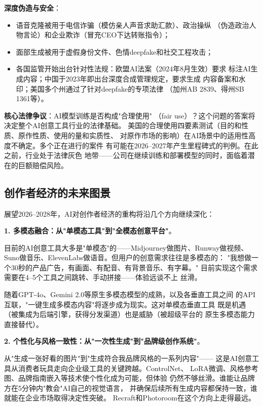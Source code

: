 \begin{warnbox}
\textbf{深度伪造与安全}：
\begin{itemize}
  \item 语音克隆被用于电信诈骗（模仿亲人声音求助汇款）、政治操纵
    （伪造政治人物言论）和企业欺诈（冒充CEO下达转账指令）；
  \item 面部生成被用于虚假身份文件、色情deepfake和社交工程攻击；
  \item 各国监管开始出台针对性法规：欧盟AI法案（2024年8月生效）要求
    标注AI生成内容；中国于2023年即出台深度合成管理规定，要求生成
    内容备案和水印；美国多个州通过了针对deepfake的专项法律
    （加州AB 2839、得州SB 1361等）。
\end{itemize}

\medskip
\noindent \textbf{核心法律争议}：AI模型训练是否构成"合理使用"
（fair use）？这个问题的答案将决定整个AI创意工具行业的法律基础。
美国的合理使用四要素测试（目的和性质、原作性质、使用的量和实质性、
对原作市场的影响）在AI场景中的适用性高度不确定。多个正在进行的案件
有可能在2026--2027年产生里程碑式的判例。在此之前，行业处于法律灰色
地带——公司在继续训练和部署模型的同时，面临着潜在的巨额赔偿风险。
\end{warnbox}

\subsection{创作者经济的未来图景}
\label{subsec:create-future}

展望2026--2028年，AI对创作者经济的重构将沿几个方向继续深化：

\textbf{1. 多模态融合：从"单模态工具"到"全模态创意平台"}。

目前的AI创意工具大多是"单模态"的——Midjourney做图片、Runway做视频、
Suno做音乐、ElevenLabs做语音。但用户的创意需求往往是多模态的：
"我想做一个30秒的产品广告，有画面、有配音、有背景音乐、有字幕。"
目前实现这个需求需要在4--5个工具之间跳转、手动拼接——体验远谈不上
丝滑。

随着GPT-4o、Gemini 2.0等原生多模态模型的成熟，以及各垂直工具之间
的API互联，"一键生成多模态内容"将逐步成为现实。这对单模态垂直工具
既是机遇（被集成为后端引擎，获得分发渠道）也是威胁（被超级平台的
原生多模态能力直接替代）。

\textbf{2. 个性化与风格一致性：从"一次性生成"到"品牌级创作系统"}。

从"生成一张好看的图片"到"生成符合我品牌风格的一系列内容"——
这是AI创意工具从消费者玩具走向企业级工具的关键跨越。ControlNet、
LoRA微调、风格参考图、品牌指南嵌入等技术使个性化成为可能，但体验
仍然不够丝滑。谁能让品牌方在5分钟内"教会"AI自己的视觉语言，
并确保后续所有生成内容都保持一致，谁就能在企业市场取得决定性突破。
Recraft和Photoroom在这个方向上走得最远。

